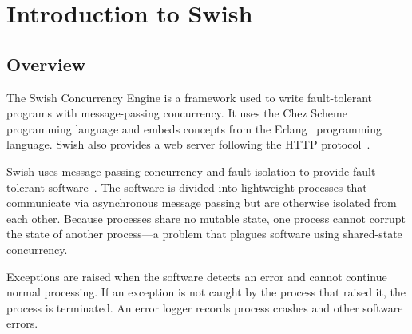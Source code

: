 %
%
%

\chapter {Introduction to Swish}\label{chap:intro-swish}

\section {Overview}

The Swish Concurrency Engine is a framework used to write
fault-tolerant programs with message-passing concurrency. It uses the
Chez Scheme~\cite{chez-scheme-users-guide} programming language and
embeds concepts from the Erlang~\cite{erlang} programming
language. Swish also provides a web server following the HTTP
protocol~\cite{RFC7230}.

Swish uses message-passing concurrency and fault isolation to
provide fault-tolerant software~\cite{armstrong-thesis,actors}. The
software is divided into lightweight processes that communicate via
asynchronous message passing but are otherwise isolated from each
other. Because processes share no mutable state, one process cannot
corrupt the state of another process---a problem that plagues software
using shared-state concurrency.

Exceptions are raised when the software detects an error and cannot
continue normal processing. If an exception is not caught by the
process that raised it, the process is terminated. An error logger
records process crashes and other software errors.

